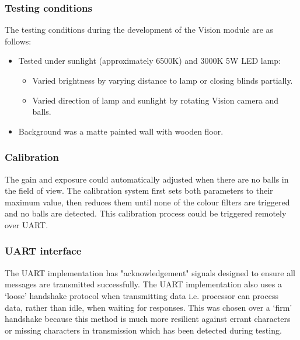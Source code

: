\documentclass[11pt, a4paper]{article}
\begin{document}
\subsubsection{Testing conditions}

The testing conditions during the development of the Vision module are as follows:
\begin{itemize}
    \item Tested under sunlight (approximately 6500K) and 3000K 5W LED lamp:
    \begin{itemize}
        \item Varied brightness by varying distance to lamp or closing blinds partially.
        \item Varied direction of lamp and sunlight by rotating Vision camera and balls.
    \end{itemize}
    \item Background was a matte painted wall with wooden floor.
\end{itemize} 

\subsubsection{Calibration}

The gain and exposure could automatically adjusted when there are no balls in the field of view. The calibration system first sets both parameters to their maximum value, then reduces them until none of the colour filters are triggered and no balls are detected. This calibration process could be triggered remotely over UART.

\subsubsection{UART interface}

The UART implementation has "acknowledgement" signals designed to ensure all messages are transmitted successfully. The UART implementation also uses a ‘loose’ handshake protocol when transmitting data i.e. processor can process data, rather than idle, when waiting for responses. This was chosen over a ‘firm’ handshake because this method is much more resilient against errant characters or missing characters in transmission which has been detected during testing.
\end{document}
